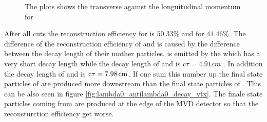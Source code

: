 		\begin{figure}
			
			\caption{The plots shows the transverse against the longuitudinal momentum for \lam}
			\label{fig:lambda0_pt_vs_pz}
		
		\end{figure}
		After all cuts the reconstruction efficiency for \lam is $50.33\%$ and for \alam $41.46\%$.
		The difference of the reconstruction efficiency of \lam and \alam is caused by the difference between the decay length of their mother particles.
		\lam is emitted by the \excitedcascade which has a very short decay length while the decay length of \cascade and \anticascade is c$\tau = 4.91 \unit{cm}$ \cite{PDG}.
		In addition the decay length of \lam and \alam is $\textnormal{c}\tau = 7.98 \, \textnormal{cm}$.
		If one sum this number up the final state particles of \alam are produced more downstream than the final state particles of \lam.
		This can be also seen in figure \ref{fig:lambda0_antilambda0_decay_vtx}.
		The finale state particles coming from \alam are produced at the edge of the MVD detector so that the reconsturction efficiency get worse.
		
